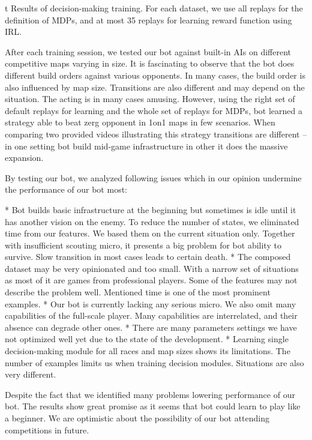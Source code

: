 \midinsert {}
\caption/t Results of decision-making training. For each dataset, we use all replays for the definition of MDPs, and at most 35 replays for learning reward function using IRL.
\endinsert

After each training session, we tested our bot against built-in AIs on different competitive maps varying in size. It is fascinating to observe that the bot does different build orders against various opponents. In many cases, the build order is also influenced by map size. Transitions are also different and may depend on the situation. The acting is in many cases amusing. However, using the right set of default replays for learning and the whole set of replays for MDPs, bot learned a strategy able to beat zerg opponent in 1on1 maps in few scenarios. When comparing two provided videos illustrating this strategy transitions are different – in one setting bot build mid-game infrastructure in other it does the massive expansion. 

By testing our bot, we analyzed following issues which in our opinion undermine the performance of our bot most:

\begitems
* Bot builds basic infrastructure at the beginning but sometimes is idle until it has another vision on the enemy. To reduce the number of states, we eliminated time from our features. We based them on the current situation only. Together with insufficient scouting micro, it presents a big problem for bot ability to survive. Slow transition in most cases leads to certain death.
* The composed dataset may be very opinionated and too small. With a narrow set of situations as most of it are games from professional players. Some of the features may not describe the problem well. Mentioned time is one of the most prominent examples.
* Our bot is currently lacking any serious micro. We also omit many capabilities of the full-scale player. Many capabilities are interrelated, and their absence can degrade other ones.
* There are many parameters settings we have not optimized well yet due to the state of the development.
* Learning single decision-making module for all races and map sizes shows its limitations. The number of examples limits us when training decision modules. Situations are also very different.
\enditems

Despite the fact that we identified many problems lowering performance of our bot. The results show great promise as it seems that bot could learn to play like a beginner. We are optimistic about the possibility of our bot attending competitions in future.
